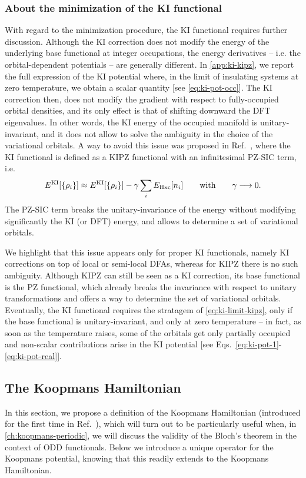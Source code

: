 \subsubsection*{About the minimization of the KI functional}
With regard to the minimization procedure, the KI functional requires further discussion. Although the KI correction does not modify the energy of the underlying base functional at integer occupations, the energy derivatives -- i.e. the orbital-dependent potentials -- are generally different. In \cref{app:ki-kipz}, we report the full expression of the KI potential where, in the limit of insulating systems at zero temperature, we obtain a scalar quantity [see \cref{eq:ki-pot-occ}]. The KI correction then, does not modify the gradient with respect to fully-occupied orbital densities, and its only effect is that of shifting downward the DFT eigenvalues. In other words, the KI energy of the occupied manifold is unitary-invariant, and it does not allow to solve the ambiguity in the choice of the variational orbitals. A way to avoid this issue was proposed in Ref.~\cite{borghi_koopmans-compliant_2014}, where the KI functional is defined as a KIPZ functional with an infinitesimal PZ-SIC term, i.e.
%
\begin{equation}
    E^{\rm KI}[\{ \rho_i \}] \approx E^{\rm KI}[\{ \rho_i \}] - \gamma \sum_i E_{\rm Hxc}[n_i]
    \qquad \text{with} \qquad \gamma \longrightarrow 0 .
    \label{eq:ki-limit-kipz}
\end{equation}
%
The PZ-SIC term breaks the unitary-invariance of the energy without modifying significantly the KI (or DFT) energy, and allows to determine a set of variational orbitals.

We highlight that this issue appears only for proper KI functionals, namely KI corrections on top of local or semi-local DFAs, whereas for KIPZ there is no such ambiguity. Although KIPZ can still be seen as a KI correction, its base functional is the PZ functional, which already breaks the invariance with respect to unitary transformations and offers a way to determine the set of variational orbitals. Eventually, the KI functional requires the stratagem of \cref{eq:ki-limit-kipz}, only if the base functional is unitary-invariant, and only at zero temperature -- in fact, as soon as the temperature raises, some of the orbitals get only partially occupied and non-scalar contributions arise in the KI potential [see Eqs.~\eqref{eq:ki-pot-1}-\eqref{eq:ki-pot-real}].

\subsection{The Koopmans Hamiltonian\label{sec:koopmans-hamiltonian}}
In this section, we propose a definition of the Koopmans Hamiltonian (introduced for the first time in Ref.~\cite{de_gennaro_blochs_2022}), which will turn out to be particularly useful when, in \cref{ch:koopmans-periodic}, we will discuss the validity of the Bloch's theorem in the context of ODD functionals. Below we introduce a unique operator for the Koopmans potential, knowing that this readily extends to the Koopmans Hamiltonian.

